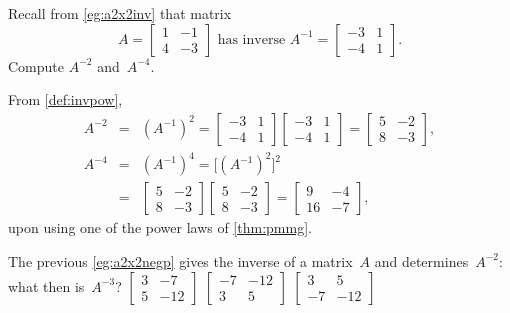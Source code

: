 \begin{example} \label{eg:a2x2negp}
Recall from \cref{eg:a2x2inv} that matrix
\begin{equation*}
A=\begin{bmatrix} 1&-1\\4&-3 \end{bmatrix}
\text{ has inverse }
A^{-1}=\begin{bmatrix} -3&1\\-4&1 \end{bmatrix}.
\end{equation*}
Compute \(A^{-2}\) and~\(A^{-4}\).
\begin{solution} 
From \cref{def:invpow},
\begin{eqnarray*}
A^{-2}&=&(A^{-1})^2
=\begin{bmatrix} -3&1\\-4&1 \end{bmatrix}\begin{bmatrix} -3&1\\-4&1 \end{bmatrix}
=\begin{bmatrix} 5&-2\\8&-3 \end{bmatrix},
\\
A^{-4}&=&(A^{-1})^4
=\big[(A^{-1})^2\big]^2
\\&=&\begin{bmatrix} 5&-2\\8&-3 \end{bmatrix}\begin{bmatrix} 5&-2\\8&-3 \end{bmatrix}
=\begin{bmatrix} 9&-4\\16&-7 \end{bmatrix},
\end{eqnarray*}
upon using one of the power laws of \cref{thm:pmmg}.
\end{solution}
\end{example}


\begin{activity}
The previous \cref{eg:a2x2negp} gives the inverse of a matrix~\(A\) and determines~\(A^{-2}\): what then is~\(A^{-3}\)?
{\(\begin{bmatrix} 3&-7\\5&-12 \end{bmatrix}\)}
{\(\begin{bmatrix} -7&-12\\3&5 \end{bmatrix}\)}
{\(\begin{bmatrix} 3&5\\-7&-12 \end{bmatrix}\)}
\end{activity}





